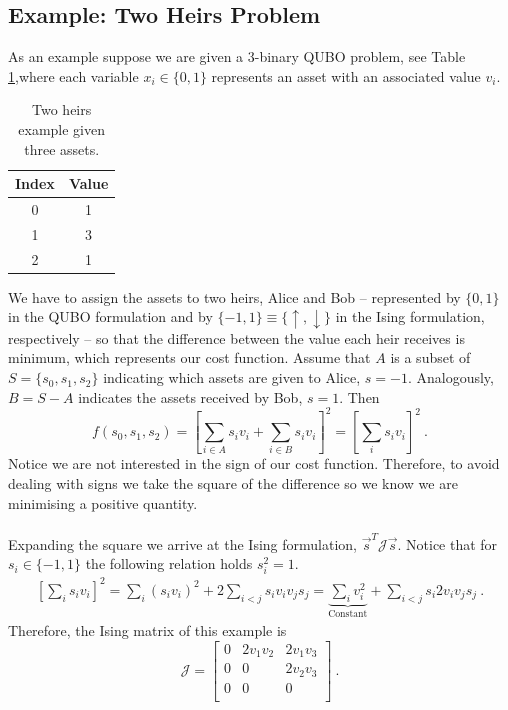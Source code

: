 \subsection{Example: Two Heirs Problem}
 As an example suppose we are given a 3-binary QUBO problem, see Table\,\ref{tab:Assets},where each variable $x_{i} \in \{0,1\}$ represents an asset with an associated value $v_{i}$.
\begin{table}[H]
\centering
\begin{tabular}{ |c | c| }
  \hline			
  \textbf{Index} & \textbf{Value}  \\
    \hline		
   0 & 1\\
       \hline		
   1 & 3\\
       \hline		
   2 & 1\\
        \hline	
\end{tabular}
\caption{Two heirs example given three assets.}
\label{tab:Assets}
\end{table}
We have to assign the assets to two heirs, Alice and Bob -- represented by $\{0,1\}$ in the QUBO formulation and by $\{-1,1\}\equiv \{\uparrow, \downarrow\}$ in the Ising formulation, respectively -- so that the difference between the value each heir receives is minimum, which represents our cost function. Assume that $A$ is a subset of $S = \{s_{0},s_{1},s_{2}\}$ indicating which assets are given to Alice, $s=-1$. Analogously,  $B = S - A$ indicates the assets received by Bob, $s=1$. Then
\begin{equation} 
    f(s_{0}, s_{1}, s_{2}) = \left[\sum_{i\in A}s_{i}v_{i} + \sum_{i\in B}s_{i}v_{i}\right]^{2} = \left[\sum_{i}s_{i}v_{i}\right]^{2}\ .
\end{equation}
Notice we are not interested in the sign of our cost function. Therefore, to avoid dealing with signs we take the square of the difference so we know we are minimising a positive quantity.\\\\
Expanding the square we arrive at the Ising formulation, $\vec{s}^{T}\mathcal{J}\vec{s}$. Notice that for $s_{i} \in \{-1,1\}$ the following relation holds $s_{i}^{2}=1$. 
\begin{align}
    \left[\sum_{i}s_{i}v_{i}\right]^{2} = \sum_{i}\left(s_{i}v_{i}\right)^{2} + 2\sum_{i<j}s_{i}v_{i}v_{j}s_{j} = \underbrace{\sum_{i}v_{i}^{2}}_{\textrm{Constant}} + \sum_{i<j}s_{i}2v_{i}v_{j}s_{j}\ .
\end{align}
Therefore, the Ising matrix of this example is
\begin{equation}
\mathcal{J}= 
    \begin{bmatrix}
           0 & 2v_{1}v_{2} & 2v_{1}v_{3}\\
           0 & 0 & 2v_{2}v_{3}\\
           0& 0 & 0\\
         \end{bmatrix}\ .
\end{equation}
